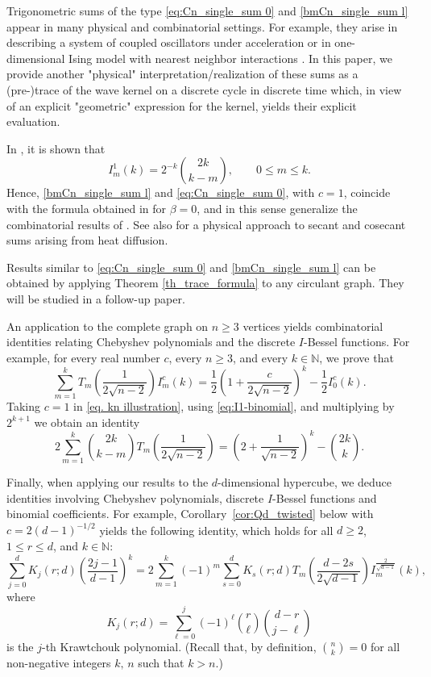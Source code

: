 \documentclass[reqno,10pt]{amsart}
\theoremstyle{definition}
\numberwithin{equation}{section}
\begin{document}
Trigonometric sums of the type \eqref{eq:Cn_single_sum 0} and \eqref{bmCn_single_sum l} appear in many physical and combinatorial settings. For example, they arise in describing a system of coupled oscillators under acceleration \cite{Ho19} or in one-dimensional Ising model with nearest neighbor interactions \cite[Chapter III]{MW14}. In this paper, we provide another "physical" interpretation/realization of these sums as a (pre-)trace of the wave kernel on a discrete cycle in discrete time which, in view of an explicit "geometric" expression for the kernel, yields their explicit evaluation.

In \cite[Remark 5.2]{BSS26}, it is shown that 
\begin{equation}\label{eq:I1-binomial}
   I_m^{1}(k)= 2^{-k}\binom{2k}{k-m}, \qquad 0\le m\le k.
\end{equation} 
Hence, \eqref{bmCn_single_sum l} and \eqref{eq:Cn_single_sum 0}, with $c=1$, coincide with the formula obtained in \cite[Corollary 11]{CJHSVcomb} for $\beta=0$,  and in this sense generalize the combinatorial results of \cite{dFK13,dFGK17,Me12}. See also \cite{JKS24} for a physical approach to secant and cosecant sums arising from heat diffusion.

Results similar to \eqref{eq:Cn_single_sum 0} and \eqref{bmCn_single_sum l} can be obtained by applying Theorem \ref{th_trace_formula} to any circulant graph. They will be studied in a follow-up paper.

An application to the complete graph on $n\geq 3$ vertices yields combinatorial identities relating Chebyshev polynomials and the discrete $I$-Bessel functions. For example, for every real number $c$, every $n\ge3$, and every $k \in \mathbb{N}$, we prove that
\begin{equation}\label{eq. kn illustration}
\sum_{m=1}^{k}
T_m\!\left(\frac{1}{2\sqrt{n-2}}\right)
I_m^{c}(k)= \frac{1}{2}\left(1+\frac{c}{2\sqrt{n-2}}\right)^k-\frac{1}{2}I_0^{c}(k).
\end{equation}
Taking $c=1$ in \eqref{eq. kn illustration}, using \eqref{eq:I1-binomial}, and multiplying by $2^{k+1}$ we obtain an identity
\begin{equation*}
2\sum_{m=1}^{k}
\binom{2k}{k-m}T_m\!\left(\frac{1}{2\sqrt{n-2}}\right)
= \left(2+\frac{1}{\sqrt{n-2}}\right)^k-\binom{2k}{k}.
\end{equation*}

Finally, when applying our results to the $d$-dimensional hypercube, we deduce identities involving Chebyshev polynomials, discrete $I$-Bessel functions and binomial coefficients. For example, Corollary~\ref{cor:Qd_twisted} below with $c=2(d-1)^{-1/2}$ yields the following identity, which holds for all $d\ge2$, $1\le r\le d$, and $k\in\mathbb N$:
\[
\sum_{j=0}^{d}
K_j(r;d)\left(\frac{2j-1}{d-1}\right)^k
=
2\sum_{m=1}^{k}
(-1)^m
\sum_{s=0}^{d}
K_s(r;d)
T_m\!\left(
\frac{d-2s}{2\sqrt{d-1}}
\right)
I_m^{\frac{2}{\sqrt{d-1}}}(k),
\]
where
\[
K_j(r;d)
=
\sum_{\ell=0}^{j}
(-1)^\ell
\binom{r}{\ell}
\binom{d-r}{j-\ell}
\]
is the $j$-th Krawtchouk polynomial. (Recall that, by definition, $\binom{n}{k}=0$ for all non-negative integers $k,\,n$ such that $k>n$.)
\end{document}
